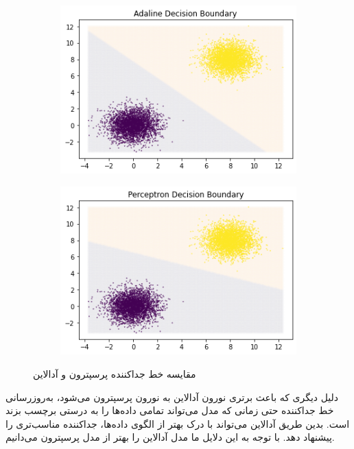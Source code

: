 \documentclass[12pt, a4paper]{article}
\begin{document}
\begin{figure}[h]
    \begin{subfigure}{0.45\linewidth}
        \centering
        \includegraphics[width=\linewidth]{images/3/adaline.png}
    \end{subfigure}
    \begin{subfigure}{0.45\linewidth}
        \centering
        \includegraphics[width=\linewidth]{images/3/perceptron.png}
    \end{subfigure}
    \caption{مقایسه خط جداکننده پرسپترون و آدالاین}
    \label{perceptron_adaline_comparison}
\end{figure}

\vspace{0.5cm}

دلیل دیگری که باعث برتری نورون آدالاین به نورون پرسپترون می‌شود، به‌روزرسانی خط جداکننده
حتی زمانی که مدل می‌تواند تمامی داده‌ها را به درستی برچسب بزند است. بدین طریق آدالاین می‌تواند با درک بهتر از
الگوی داده‌ها، جداکننده مناسب‌تری را پیشنهاد دهد. با توجه به این دلایل ما مدل آدالاین را بهتر از مدل پرسپترون
می‌دانیم.
\end{document}

